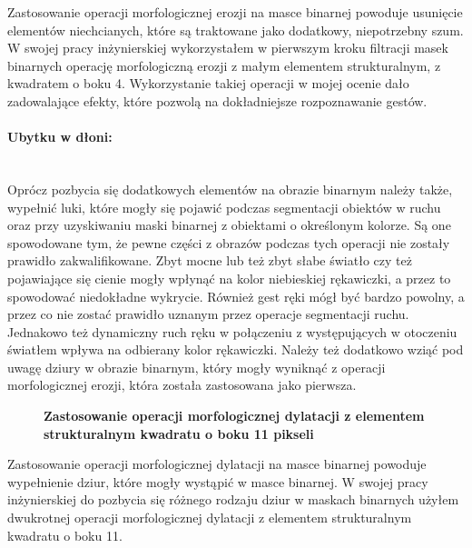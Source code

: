 \documentclass[a4paper,12pt,twoside,openany]{report}
\newcommand{\ImgPath}{.}
\begin{document}
Zastosowanie operacji morfologicznej erozji na masce binarnej powoduje usunięcie elementów niechcianych, które są traktowane jako dodatkowy, niepotrzebny szum. W swojej pracy inżynierskiej wykorzystałem w pierwszym kroku filtracji masek binarnych operację morfologiczną erozji z małym elementem strukturalnym, z kwadratem o boku 4. Wykorzystanie takiej operacji w mojej ocenie dało zadowalające efekty, które pozwolą na dokładniejsze rozpoznawanie gestów.

\paragraph{Ubytku w dłoni:} \mbox{} \\ \indent
Oprócz pozbycia się dodatkowych elementów na obrazie binarnym należy także, wypełnić luki, które mogły się pojawić podczas segmentacji obiektów w ruchu oraz przy uzyskiwaniu maski binarnej z obiektami o określonym kolorze. Są one spowodowane tym, że pewne części z obrazów podczas tych operacji nie zostały prawidło zakwalifikowane. Zbyt mocne lub też zbyt słabe światło czy też pojawiające się cienie mogły wpłynąć na kolor niebieskiej rękawiczki, a przez to spowodować niedokładne wykrycie. Również gest ręki mógł być bardzo powolny, a przez co nie zostać prawidło uznanym  przez operacje segmentacji ruchu. Jednakowo też dynamiczny ruch ręku w połączeniu z występujących w otoczeniu światłem wpływa na odbierany kolor rękawiczki. Należy też dodatkowo wziąć pod uwagę dziury w obrazie binarnym, który mogły wyniknąć z operacji morfologicznej erozji, która została zastosowana jako pierwsza. 

\begin{figure}[H]
	\centering
	\caption{  \textbf{Zastosowanie operacji morfologicznej dylatacji z elementem strukturalnym kwadratu o boku 11 pikseli}}
\end{figure}

Zastosowanie operacji morfologicznej dylatacji na masce binarnej powoduje wypełnienie dziur, które mogły wystąpić w masce binarnej. W swojej pracy inżynierskiej do pozbycia się różnego rodzaju dziur w maskach binarnych  użyłem dwukrotnej operacji morfologicznej dylatacji z elementem strukturalnym kwadratu o boku 11. 
\end{document}

